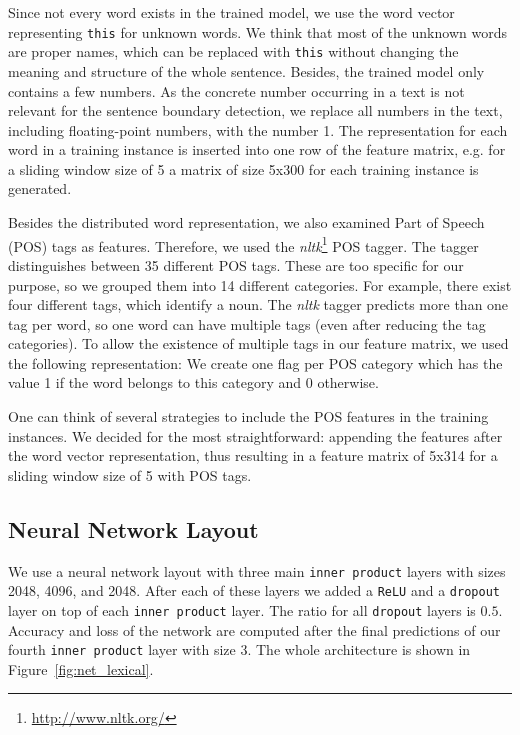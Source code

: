 Since not every word exists in the trained model, we use the word vector representing \texttt{this} for unknown words.
We think that most of the unknown words are proper names, which can be replaced with \texttt{this} without changing the meaning and structure of the whole sentence.
Besides, the trained model only contains a few numbers.
As the concrete number occurring in a text is not relevant for the sentence boundary detection, we replace all numbers in the text, including floating-point numbers, with the number 1.
The representation for each word in a training instance is inserted into one row of the feature matrix, e.g. for a sliding window size of 5 a matrix of size 5x300 for each training instance is generated.

Besides the distributed word representation, we also examined Part of Speech (POS) tags as features.
Therefore, we used the \emph{nltk}\footnote{\url{http://www.nltk.org/}} POS tagger.
The tagger distinguishes between 35 different POS tags.
These are too specific for our purpose, so we grouped them into 14 different categories.
For example, there exist four different tags, which identify a noun.
The \emph{nltk} tagger predicts more than one tag per word, so one word can have multiple tags (even after reducing the tag categories).
To allow the existence of multiple tags in our feature matrix, we used the following representation:
We create one flag per POS category which has the value 1 if the word belongs to this category and 0 otherwise.

One can think of several strategies to include the POS features in the training instances.
We decided for the most straightforward: appending the features after the word vector representation, thus resulting in a feature matrix of 5x314 for a sliding window size of 5 with POS tags.


\subsection{Neural Network Layout}

We use a neural network layout with three main \texttt{inner product} layers with sizes 2048, 4096, and 2048.
After each of these layers we added a \texttt{ReLU} and a \texttt{dropout} layer on top of each \texttt{inner product} layer.
The ratio for all \texttt{dropout} layers is $0.5$.
Accuracy and loss of the network are computed after the final predictions of our fourth \texttt{inner product} layer with size 3.
The whole architecture is shown in Figure~\ref{fig:net_lexical}.


